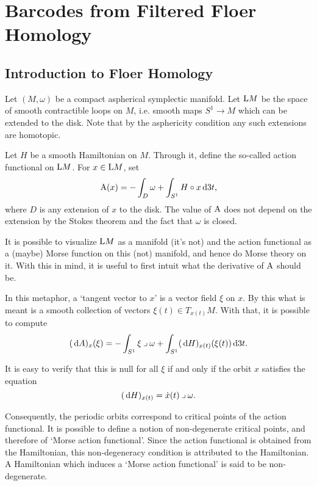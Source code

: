 
\chapter{Barcodes from Filtered Floer Homology}

\section{Introduction to Floer Homology}

Let $(M, \omega)$ be a compact aspherical symplectic manifold. Let $\LL M$ be the space of smooth contractible loops on $M$, i.e. smooth maps $S^1 \to M$ which can be extended to the disk. Note that by the asphericity condition any such extensions are homotopic.

Let $H$ be a smooth Hamiltonian on $M$. Through it, define the so-called action functional on $\LL M$. For $x \in \LL M$, set
\begin{equation}
\AA(x) = - \int_D \omega + \int_{S^1} H \circ x \dl3 t,
\end{equation}
where $D$ is any extension of $x$ to the disk. The value of $\AA$ does not depend on the extension by the Stokes theorem and the fact that $\omega$ is closed.

It is possible to visualize $\LL M$ as a manifold (it's not) and the action functional as a (maybe) Morse function on this (not) manifold, and hence do Morse theory on it. With this in mind, it is useful to first intuit what the derivative of $\AA$ should be.

In this metaphor, a `tangent vector to $x$' is a vector field $\xi$ on $x$. By this what is meant is a smooth collection of vectors $\xi(t) \in T_{x(t)} M$. With that, it is possible to compute
\begin{equation}
 (\dl A)_x(\xi) = - \int_{S^1} \xi \into \omega + \int_{S^1} (\dl H)_{x(t)} (\xi(t)) \dl3t. 
\end{equation}

It is easy to verify that this is null for all $\xi$ if and only if the orbit $x$ satisfies the equation
\begin{equation}
(\dl H)_{x(t)} = \dot x(t) \into \omega.
\end{equation}

Consequently, the periodic orbits correspond to critical points of the action functional. It is possible to define a notion of non-degenerate critical points, and therefore of `Morse action functional'. Since the action functional is obtained from the Hamiltonian, this non-degeneracy condition is attributed to the Hamiltonian. A Hamiltonian which induces a `Morse action functional' is said to be non-degenerate.

